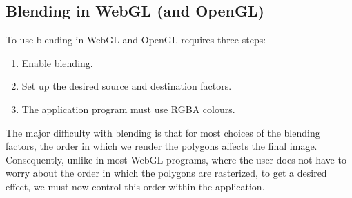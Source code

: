 \documentclass[../COS3712_Notes.tex]{subfiles}
\begin{document}
      \subsection{Blending in WebGL (and OpenGL)}
        To use blending in WebGL and OpenGL requires three steps:
        \begin{enumerate}
          \item Enable blending.
          \item Set up the desired source and destination factors.
          \item The application program must use RGBA colours.
        \end{enumerate}

        \pagebreak

        The major difficulty with blending is that for most choices of the blending factors,
        the order in which we render the polygons affects the final image.
        Consequently, unlike in most WebGL programs, where the user does not have to worry
        about the order in which the polygons are rasterized, to get a desired effect,
        we must now control this order within the application.
\end{document}
